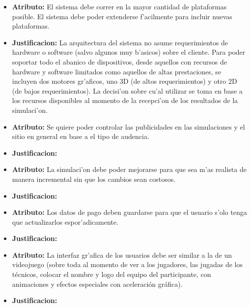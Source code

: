 \begin{itemize}
\item \textbf{Atributo:} El sistema debe correr en la mayor cantidad de plataformas posible. El sistema debe poder extenderse f'acilmente para incluir nuevas plataformas.
\item \textbf{Justificacion:} La arquitectura del sistema no asume requerimientos de hardware o software (salvo algunos muy b'asicos) sobre el cliente. Para poder soportar todo el abanico de dispositivos, desde aquellos con recursos de hardware y software limitados como aquellos de altas prestaciones, se incluyen dos motores gr'aficos, uno 3D (de altos requerimientos) y otro 2D (de bajos requerimientos). La decisi'on sobre cu'al utilizar se toma en base a los recursos disponibles al momento de la recepci'on de los resultados de la simulaci'on.



\item \textbf{Atributo:} Se quiere poder controlar las publicidades en las simulaciones y el sitio en general en base a el tipo de audencia.
\item \textbf{Justificacion:}

\item \textbf{Atributo:} La simulaci'on debe poder mejorarse para que sea m'as realista de manera incremental sin que los cambios sean costosos.
\item \textbf{Justificacion:}

\item \textbf{Atributo:} Los datos de pago deben guardarse para que el usuario s'olo tenga que actualizarlos espor'adicamente.
\item \textbf{Justificacion:}

\item \textbf{Atributo:}  La interfaz gr'afica de los usuarios debe ser similar a la de un videojuego (sobre toda al momento de ver a los jugadores, las jugadas de los técnicos, colocar el nombre y logo del equipo del participante, con animaciones y efectos especiales con aceleración gráfica).
\item \textbf{Justificacion:}


\end{itemize}
